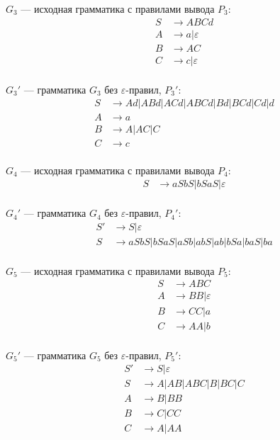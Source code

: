 \documentclass{bmstu-gost-7-32}
\begin{document}
$G_3$ — исходная грамматика с правилами вывода $P_3$:
\begin{equation}
	\begin{aligned}
		S &\to ABCd \\
		A &\to a|\varepsilon \\
		B &\to AC \\
		C &\to c|\varepsilon \\
	\end{aligned}
\end{equation}

$G_3'$ — грамматика $G_3$ без $\varepsilon$-правил, $P_3'$:
\begin{equation}
	\begin{aligned}
		S &\to Ad|ABd|ACd|ABCd|Bd|BCd|Cd|d \\
		A &\to a \\
		B &\to A|AC|C \\
		C &\to c \\
	\end{aligned}
\end{equation}

$G_4$ — исходная грамматика с правилами вывода $P_4$:
\begin{equation}
	\begin{aligned}
		S &\to aSbS|bSaS|\varepsilon \\
	\end{aligned}
\end{equation}

$G_4'$ — грамматика $G_4$ без $\varepsilon$-правил, $P_4'$:
\begin{equation}
	\begin{aligned}
		S' &\to S|\varepsilon \\
		S &\to aSbS|bSaS|aSb|abS|ab|bSa|baS|ba \\
	\end{aligned}
\end{equation}

$G_5$ — исходная грамматика с правилами вывода $P_5$:
\begin{equation}
	\begin{aligned}
		S &\to ABC \\
		A &\to BB|\varepsilon \\
		B &\to CC|a \\
		C &\to AA|b \\
	\end{aligned}
\end{equation}

$G_5'$ — грамматика $G_5$ без $\varepsilon$-правил, $P_5'$:
\begin{equation}
	\begin{aligned}
		S' &\to S|\varepsilon \\
		S &\to A|AB|ABC|B|BC|C \\
		A &\to B|BB \\
		B &\to C|CC \\
		C &\to A|AA \\
	\end{aligned}
\end{equation}
\end{document}
